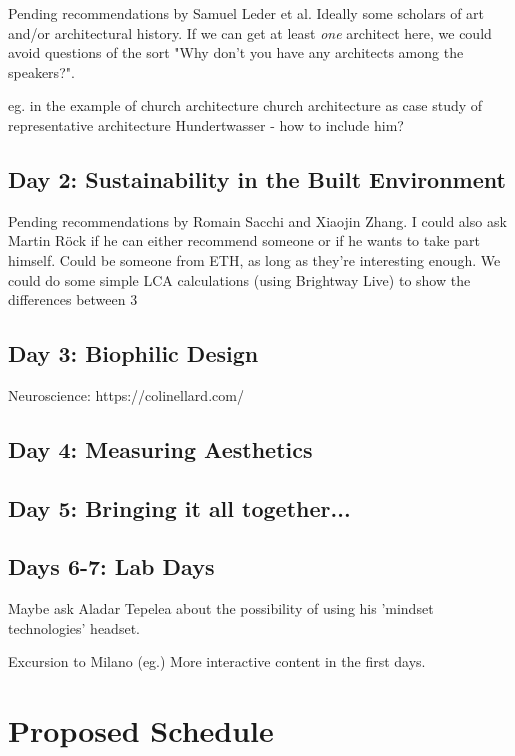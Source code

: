 \documentclass{article}
\begin{document}
Pending recommendations by Samuel Leder et al.
Ideally some scholars of art and/or architectural history.
If we can get at least \textit{one} architect here, we could avoid questions of the sort "Why don't you have any architects among the speakers?".

eg. in the example of church architecture
church architecture as case study of representative architecture
Hundertwasser - how to include him?


\subsection{Day 2: Sustainability in the Built Environment}

Pending recommendations by Romain Sacchi and Xiaojin Zhang.
I could also ask Martin Röck if he can either recommend someone or if he wants to take part himself.
Could be someone from ETH, as long as they're interesting enough.
We could do some simple LCA calculations (using Brightway Live) to show the differences between
3
\subsection{Day 3: Biophilic Design}

Neuroscience: https://colinellard.com/

\subsection{Day 4: Measuring Aesthetics}

\subsection{Day 5: Bringing it all together...}

\subsection{Days 6-7: Lab Days}

Maybe ask Aladar Tepelea about the possibility of using his 'mindset technologies' headset.

Excursion to Milano (eg.)
More interactive content in the first days.

\clearpage
\section{Proposed Schedule}
\end{document}
